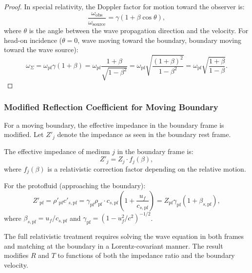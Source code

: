 \begin{proof}
In special relativity, the Doppler factor for motion toward the observer is:
\begin{equation}
\frac{\omega_{\text{obs}}}{\omega_{\text{source}}} = \gamma (1 + \beta \cos\theta),
\end{equation}
where $\theta$ is the angle between the wave propagation direction and the velocity. For head-on incidence ($\theta = 0$, wave moving toward the boundary, boundary moving toward the wave source):
\begin{equation}
\omega_\Sigma = \omega_{\text{pf}} \gamma (1 + \beta) = \omega_{\text{pf}} \frac{1 + \beta}{\sqrt{1 - \beta^2}} = \omega_{\text{pf}} \sqrt{\frac{(1 + \beta)^2}{1 - \beta^2}} = \omega_{\text{pf}} \sqrt{\frac{1 + \beta}{1 - \beta}}.
\end{equation}
\end{proof}

\subsubsection{Modified Reflection Coefficient for Moving Boundary}

For a moving boundary, the effective impedance in the boundary frame is modified. Let $Z'_j$ denote the impedance as seen in the boundary rest frame.

\begin{proposition}
\label{prop:effective_impedance}
The effective impedance of medium $j$ in the boundary frame is:
\begin{equation}
\label{eq:effective_impedance}
Z'_j = Z_j \cdot f_j(\beta),
\end{equation}
where $f_j(\beta)$ is a relativistic correction factor depending on the relative motion.

For the protofluid (approaching the boundary):
\begin{equation}
Z'_{\text{pf}} = \rho'_{\text{pf}} c'_{s,\text{pf}} = \gamma_{\text{pf}} \rho_{\text{pf}} \cdot c_{s,\text{pf}} \left( 1 + \frac{u_f}{c_{s,\text{pf}}} \right) = Z_{\text{pf}} \gamma_{\text{pf}} \left( 1 + \beta_{s,\text{pf}} \right),
\end{equation}
where $\beta_{s,\text{pf}} = u_f / c_{s,\text{pf}}$ and $\gamma_{\text{pf}} = (1 - u_f^2/c^2)^{-1/2}$.
\end{proposition}

The full relativistic treatment requires solving the wave equation in both frames and matching at the boundary in a Lorentz-covariant manner. The result modifies $R$ and $T$ to functions of both the impedance ratio and the boundary velocity.

